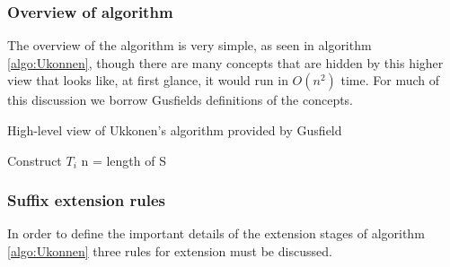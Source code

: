 \documentclass[12pt,twoside,notitlepage]{report}
\begin{document}
				\subsubsection{Overview of algorithm}
				The overview of the algorithm is very simple, as seen in algorithm \ref{algo:Ukonnen}, though there are many concepts that are hidden by this higher view that looks like, at first glance, it would run in $O(n^2)$ time. For much of this discussion we borrow Gusfields\cite{Gusfield1999} definitions of the concepts.
				
				\begin{algorithm}
				\caption{High-level view of Ukkonen's algorithm provided by Gusfield\cite{Gusfield1975}}
				\label{algo:Ukonnen}
				\begin{algorithmic}[1]
						\State Construct $T_i$
						\State n = length of S
							\EndFor

						\EndFor


					\EndProcedure
				\end{algorithmic}
				\end{algorithm}
				
				
				
				\subsubsection{Suffix extension rules}
				In order to define the important details of the extension stages of algorithm \ref{algo:Ukonnen} three rules for extension must be discussed.
				
\end{document}
